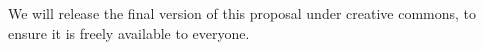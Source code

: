 We will release the final version of this proposal under creative commons, to ensure it is freely available to everyone.